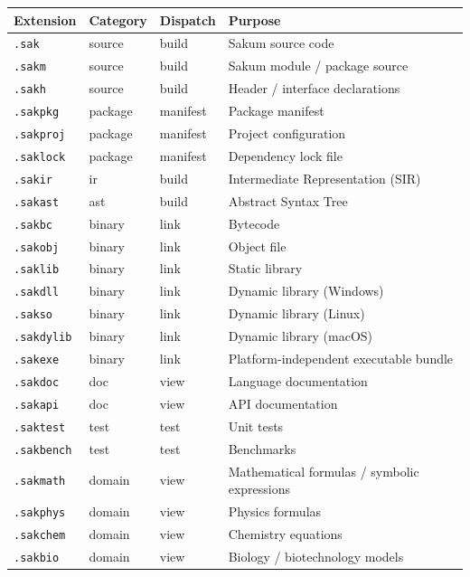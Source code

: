 \documentclass[11pt,a4paper]{article}
\begin{document}
\begin{longtable}{|l|l|l|p{6.5cm}|}
\hline
\textbf{Extension} & \textbf{Category} & \textbf{Dispatch} & \textbf{Purpose} \\
\hline\endhead
\texttt{.sak} & source & build & Sakum source code \\
\hline
\texttt{.sakm} & source & build & Sakum module / package source \\
\hline
\texttt{.sakh} & source & build & Header / interface declarations \\
\hline
\texttt{.sakpkg} & package & manifest & Package manifest \\
\hline
\texttt{.sakproj} & package & manifest & Project configuration \\
\hline
\texttt{.saklock} & package & manifest & Dependency lock file \\
\hline
\texttt{.sakir} & ir & build & Intermediate Representation (SIR) \\
\hline
\texttt{.sakast} & ast & build & Abstract Syntax Tree \\
\hline
\texttt{.sakbc} & binary & link & Bytecode \\
\hline
\texttt{.sakobj} & binary & link & Object file \\
\hline
\texttt{.saklib} & binary & link & Static library \\
\hline
\texttt{.sakdll} & binary & link & Dynamic library (Windows) \\
\hline
\texttt{.sakso} & binary & link & Dynamic library (Linux) \\
\hline
\texttt{.sakdylib} & binary & link & Dynamic library (macOS) \\
\hline
\texttt{.sakexe} & binary & link & Platform-independent executable bundle \\
\hline
\texttt{.sakdoc} & doc & view & Language documentation \\
\hline
\texttt{.sakapi} & doc & view & API documentation \\
\hline
\texttt{.saktest} & test & test & Unit tests \\
\hline
\texttt{.sakbench} & test & test & Benchmarks \\
\hline
\texttt{.sakmath} & domain & view & Mathematical formulas / symbolic expressions \\
\hline
\texttt{.sakphys} & domain & view & Physics formulas \\
\hline
\texttt{.sakchem} & domain & view & Chemistry equations \\
\hline
\texttt{.sakbio} & domain & view & Biology / biotechnology models \\

\end{longtable}
\end{document}

